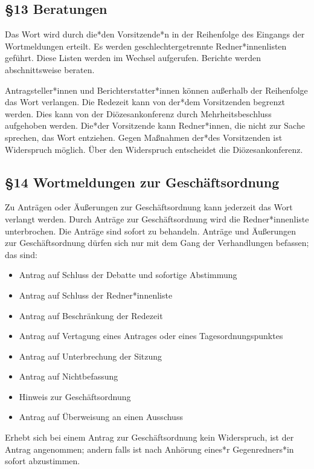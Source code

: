 \documentclass[12pt]{report}
\begin{document}
\begin{flushleft}
\subsection*{§13 Beratungen}
Das Wort wird durch die*den Vorsitzende*n in der Reihenfolge des Eingangs der Wortmeldungen erteilt.
Es werden geschlechtergetrennte Redner*innenlisten geführt. Diese Listen werden im Wechsel aufgerufen.
Berichte werden abschnittsweise beraten.

Antragsteller*innen und Berichterstatter*innen können außerhalb der Reihenfolge das Wort verlangen. Die Redezeit
kann von der*dem Vorsitzenden begrenzt werden. Dies kann von der Diözesankonferenz durch Mehrheitsbeschluss
aufgehoben werden. Die*der Vorsitzende kann Redner*innen, die nicht zur Sache sprechen, das
Wort entziehen. Gegen Maßnahmen der*des Vorsitzenden ist Widerspruch möglich. Über den Widerspruch
entscheidet die Diözesankonferenz.

\subsection*{§14 Wortmeldungen zur Geschäftsordnung}
Zu Anträgen oder Äußerungen zur Geschäftsordnung kann jederzeit das Wort verlangt werden.
Durch Anträge zur Geschäftsordnung wird die Redner*innenliste unterbrochen. Die Anträge sind sofort zu
behandeln. Anträge und Äußerungen zur Geschäftsordnung dürfen sich nur mit dem Gang der Verhandlungen
befassen; das sind:

\begin{itemize}
  \item Antrag auf Schluss der Debatte und sofortige Abstimmung
  \item Antrag auf Schluss der Redner*innenliste
  \item Antrag auf Beschränkung der Redezeit
  \item Antrag auf Vertagung eines Antrages oder eines Tagesordnungspunktes
  \item Antrag auf Unterbrechung der Sitzung
  \item Antrag auf Nichtbefassung
  \item Hinweis zur Geschäftsordnung
  \item Antrag auf Überweisung an einen Ausschuss
\end{itemize}

Erhebt sich bei einem Antrag zur Geschäftsordnung kein Widerspruch, ist der Antrag angenommen; andern
falls ist nach Anhörung eines*r Gegenredners*in sofort abzustimmen.


\end{flushleft}
\end{document}

